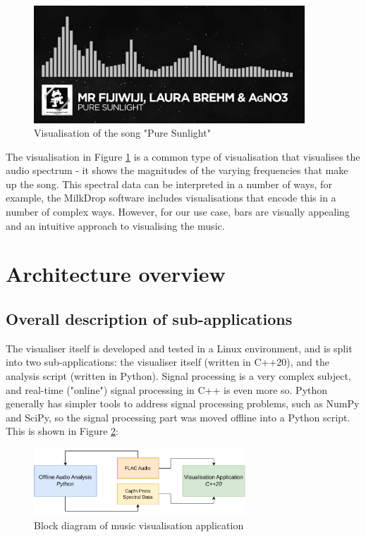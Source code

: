 \documentclass[11pt]{article}
\begin{document}
\begin{figure}[H]
\centering
\includegraphics[width=384px]{img/monstercat.png}
\caption{Visualisation of the song "Pure Sunlight" \cite{youtubeElectronicFijiWiji}}
\label{fig:monstercat}
\end{figure}

The visualisation in Figure \ref{fig:monstercat}
is a common type of visualisation that visualises the audio spectrum - it shows the magnitudes of the varying
frequencies that make up the song. This spectral data can be interpreted in a number of ways, for example, the
MilkDrop \cite{milkdrop} software includes visualisations that encode this in a number of complex ways. However,
for our use case, bars are visually appealing and an intuitive approach to visualising the music.

\section{Architecture overview}
\subsection{Overall description of sub-applications}
The visualiser itself is developed and tested in a Linux environment, and is split into two sub-applications:
the visualiser itself (written in C++20), and the analysis script (written in Python). Signal processing is a
very complex subject, and real-time ("online") signal processing in C++ is even more so. Python generally has
simpler tools to address signal processing problems, such as NumPy and SciPy, so the signal processing part
was moved offline into a Python script. This is shown in Figure \ref{fig:block}:

\begin{figure}[H]
\centering
\includegraphics[width=300px]{img/diagram.drawio.pdf}
\caption{Block diagram of music visualisation application}
\label{fig:block}
\end{figure}
\end{document}
